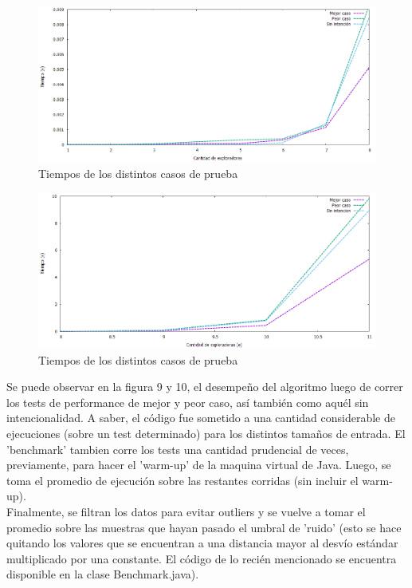 \documentclass[10pt, a4paper]{article}
\begin{document}
	\begin{figure}[H]
  		\centering
   	 	\includegraphics[width=1\textwidth]
   	 	{Imagenes/exploradorasGeneralChico.png}
		\caption{Tiempos de los distintos casos de prueba}
	\end{figure}
	\begin{figure}[H]
  		\centering
   	 	\includegraphics[width=1\textwidth]
   	 	{Imagenes/exploradorasGeneral.png}
		\caption{Tiempos de los distintos casos de prueba}
	\end{figure}
	  
	Se puede observar en la figura 9 y 10, el desempeño del algoritmo luego de correr los tests de performance de mejor y peor caso, así también como aquél sin intencionalidad.
	A saber, el código fue sometido a una cantidad considerable de ejecuciones (sobre un test determinado) para los distintos tamaños de entrada. El 'benchmark' tambien corre los tests una cantidad prudencial de veces, previamente, para hacer el 'warm-up' de la maquina virtual de Java. Luego, se toma el promedio de ejecución sobre las restantes corridas (sin incluir el warm-up).
	\\Finalmente, se filtran los datos para evitar outliers y se vuelve a tomar el promedio sobre las muestras que hayan pasado el umbral de 'ruido' (esto se hace quitando los valores que se encuentran a una distancia mayor al desvío estándar multiplicado por una constante. El código de lo recién mencionado se encuentra disponible en la clase Benchmark.java).
\end{document}
